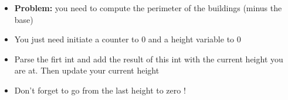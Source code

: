 
\begin{frame}
    \frametitle{\problemtitle}
    \begin{itemize}
        \item<+-> \textbf{Problem:} you need to compute the perimeter of the buildings (minus the base)
        \item<+-> You just need initiate a counter to 0 and a height variable to 0
        \item<+-> Parse the firt int and add the result of this int with the current height you are at. Then update your current height
          \item<+-> Don't forget to go from the last height to zero !
    \end{itemize}
\end{frame}